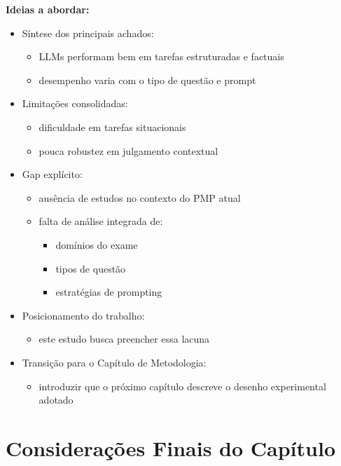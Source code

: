 \textbf{Ideias a abordar:}
\begin{itemize}
    \item Síntese dos principais achados:
    \begin{itemize}
        \item LLMs performam bem em tarefas estruturadas e factuais
        \item desempenho varia com o tipo de questão e prompt
    \end{itemize}
    \item Limitações consolidadas:
    \begin{itemize}
        \item dificuldade em tarefas situacionais
        \item pouca robustez em julgamento contextual
    \end{itemize}
    \item Gap explícito:
    \begin{itemize}
        \item ausência de estudos no contexto do PMP atual
        \item falta de análise integrada de:
        \begin{itemize}
            \item domínios do exame
            \item tipos de questão
            \item estratégias de prompting
        \end{itemize}
    \end{itemize}
    \item Posicionamento do trabalho:
    \begin{itemize}
        \item este estudo busca preencher essa lacuna
    \end{itemize}
    \item Transição para o Capítulo de Metodologia:
    \begin{itemize}
        \item introduzir que o próximo capítulo descreve o desenho experimental adotado
    \end{itemize}
\end{itemize}


\section{Considerações Finais do Capítulo}
\label{subsec:sintese_gap}